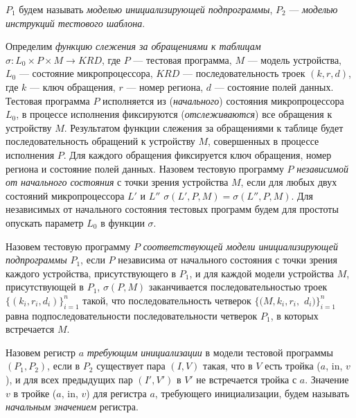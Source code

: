 $P_1$ будем называть \emph{моделью инициализирующей подпрограммы}, $P_2$ --- \emph{моделью инструкций тестового шаблона}.

Определим \emph{функцию слежения за обращениями к таблицам} $\sigma: L_0 \times P \times M \rightarrow KRD$, где $P$ --- тестовая программа, $M$ --- модель устройства, $L_0$ --- состояние микропроцессора, $KRD$ --- последовательность троек $(k, r, d)$, где $k$ --- ключ обращения, $r$ --- номер региона, $d$ --- состояние полей данных. Тестовая программа $P$ исполняется из (\emph{начального}) состояния микропроцессора $L_0$, в процессе исполнения фиксируются (\emph{отслеживаются}) все обращения к устройству $M$. Результатом функции слежения за обращениями к таблице будет последовательность обращений к устройству $M$, совершенных в процессе исполнения $P$. Для каждого обращения фиксируется ключ обращения, номер региона и состояние полей данных. Назовем тестовую программу $P$ \emph{независимой от начального состояния} с точки зрения устройства $M$, если для любых двух состояний микропроцессора $L'$ и $L''$  $\sigma(L', P, M) = \sigma(L'', P, M)$. Для независимых от начального состояния тестовых программ будем для простоты опускать параметр $L_0$ в функции $\sigma$.

Назовем тестовую программу $P$ \emph{соответствующей модели инициализирующей подпрограммы} $P_1$, если $P$ независима от начального состояния с точки зрения каждого устройства, присутствующего в $P_1$, и для каждой модели устройства $M$, присутствующей в $P_1$, $\sigma(P, M)$ заканчивается последовательностью троек $\{(k_i, r_i, d_i)\}_{i=1}^n$ такой, что последовательность четверок $\{(M, k_i, r_i,$ $d_i)\}_{i=1}^n$ равна подпоследовательности последовательности четверок $P_1$, в которых встречается $M$.

Назовем регистр $a$ \emph{требующим инициализации} в модели тестовой программы $(P_1, P_2)$, если в $P_2$ существует пара $(I, V)$ такая, что в $V$ есть тройка ($a$, in, $v$), и для всех предыдущих пар $(I', V')$ в $V'$ не встречается тройка с $a$. Значение $v$ в тройке ($a$, in, $v$) для регистра $a$, требующего инициализации, будем называть \emph{начальным значением} регистра.

